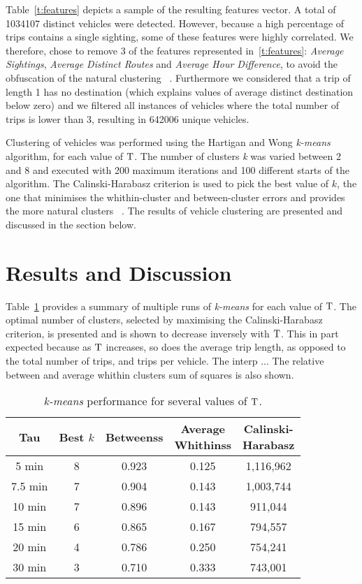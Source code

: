 Table~\ref{t:features} depicts a sample of the resulting features vector. A total of 1034107 distinct vehicles were detected. However, because a high percentage of trips contains a single sighting, some of these features were highly correlated. We therefore, chose to remove 3 of the features represented in~\ref{t:features}: \emph{Average Sightings}, \emph{Average Distinct Routes} and \emph{Average Hour Difference}, to avoid the obfuscation of the natural clustering ~\cite{Kmeans}. Furthermore we considered that a trip of length 1 has no destination (which explains values of average distinct destination below zero) and we filtered all instances of vehicles where the total number of trips is lower than 3, resulting in 642006 unique vehicles.

Clustering of vehicles was performed using the Hartigan and Wong \emph{k-means} algorithm, for each value of $\mathrm{T}$. The number of clusters \emph{k} was varied between 2 and 8 and executed with 200 maximum iterations and 100 different starts of the algorithm. The Calinski-Harabasz criterion is used to pick the best value of $k$, the one that minimises the whithin-cluster and between-cluster errors and provides the more natural clusters ~\cite{Kmeans}. The results of vehicle clustering are presented and discussed in the section below.

\section{Results and Discussion}\label{s.results}

Table~\ref{t:tau_comparison} provides a summary of multiple runs of \emph{k-means} for each value of $\mathrm{T}$. The optimal number of clusters, selected by maximising the Calinski-Harabasz criterion, is presented and is shown to decrease inversely with $\mathrm{T}$. This in part expected because as $\mathrm{T}$ increases, so does the average trip length, as opposed to the total number of trips, and trips per vehicle.  The interp   ... The relative between and average whithin clusters sum of squares is also shown.

\begin{table}[ht]
\centering
\tabcolsep=0.17cm
\begin{tabular}{c c c c c}
  \hline
Tau & Best $k$ & Betweenss & \thead{Average\\Whithinss} & \thead{Calinski-\\Harabasz} \\
  \hline
5 min &   8 & 0.923 & 0.125 & 1,116,962 \\
  7.5 min &   7 & 0.904 & 0.143 & 1,003,744 \\
  10 min&   7 & 0.896 & 0.143 &   911,044 \\
  15 min &   6 & 0.865 & 0.167 &   794,557 \\
  20 min &   4 & 0.786 & 0.250 &   754,241 \\
  30 min &   3 & 0.710 & 0.333 &   743,001 \\
   \hline
\end{tabular}
\caption{\emph{k-means} performance for several values of $\mathrm{T}$.}
\label{t:tau_comparison}
\end{table}


